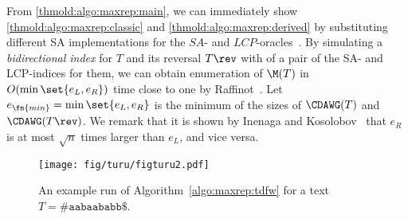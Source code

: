 From \cref{thmold:algo:maxrep:main}, we can immediately show \cref{thmold:algo:maxrep:classic} and \cref{thmold:algo:maxrep:derived} 
by substituting different SA implementations for the $SA$- and $LCP$-oracles~\cite{gagie:navarro:prezza2020fully,kempa:kociumaka2023collapsing}. 
By simulating a \textit{bidirectional index} for $T$ and its reversal $T\rev$ with of a pair of the SA- and LCP-indices for them, we can obtain enumeration of $\M(T)$ in $O(\min\set{e_L, e_R})$ time close to one by Raffinot~\cite{raffinot2001maximal}. 
Let $e_\fn{min} = \min\set{e_L, e_R}$ is the minimum of the sizes of $\CDAWG(T)$ and $\CDAWG(T\rev)$. 
We remark that it is shown by Inenaga and Kosolobov~\cite{inenaga:kosolobov2024relating:left:right} that $e_R$ is at most $\sqrt{n}$ times larger than $e_L$, and vice versa. 







\begin{figure}[t]
\centering  
  \texttt{[image: fig/turu/figturu2.pdf]}
  \caption{An example run of Algorithm~\ref{algo:maxrep:tdfw} for a text $T = \mathtt{\#aabaababb\$}$.
}\label{fig:run:example}
\end{figure}

